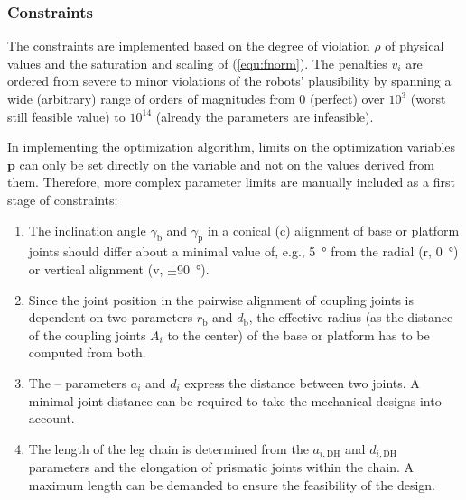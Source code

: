 
%
%
%


\subsubsection{Constraints}
\label{sec:ds_constraints}

The constraints are implemented based on the degree of violation $\rho$ of physical values and the saturation and scaling of (\ref{equ:fnorm}). The penalties $v_i$ are ordered from severe to minor violations of the robots' plausibility by spanning a wide (arbitrary) range of orders of magnitudes from 0 (perfect) over $10^3$ (worst still feasible value) to $10^{14}$ (already the parameters are infeasible).

In implementing the optimization algorithm, limits on the optimization variables $\bm{p}$ can only be set directly on the variable and not on the values derived from them.
Therefore, more complex parameter limits are manually included as a first stage of constraints:
\begin{enumerate}
  \item \label{itm:constr_param_inclination} The inclination angle $\gamma_\mathrm{b}$ and $\gamma_\mathrm{p}$ in a conical (c) alignment of base or platform joints should differ about a minimal value of, e.g., \SI{5}{\degree} from the radial (r, \SI{0}{\degree}) or vertical alignment (v, $\pm{}$\SI{90}{\degree}). %
  \item \label{itm:constr_param_radius} Since the joint position in the pairwise alignment of coupling joints is dependent on two parameters $r_\mathrm{b}$ and $d_\mathrm{b}$, %
  the effective radius (as the distance of the coupling joints $A_i$ to the center) of the base or platform has to be computed from both.
  \item \label{itm:constr_param_jointdist} The -- parameters $a_i$ and $d_i$ express the distance between two joints. A minimal joint distance can be required to take the mechanical designs into account.
  \item \label{itm:constr_param_chainlength} The length of the leg chain is determined from the $a_{i,\text{DH}}$ and $d_{i,\text{DH}}$ parameters and the elongation of prismatic joints within the chain. A maximum length can be demanded to ensure the feasibility of the design.
\end{enumerate}

